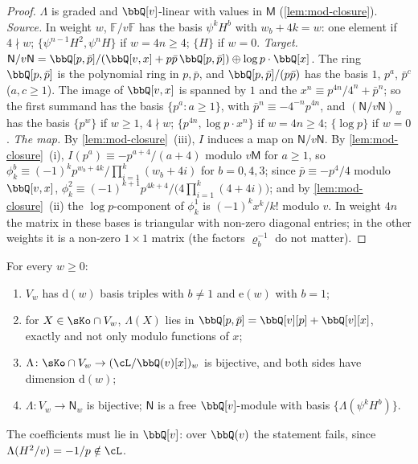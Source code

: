 \begin{proof}
$\Lambda$ is graded and $\bbQ[v]$-linear with values in $\mathsf M$ (\cref{lem:mod-closure}). \emph{Source.} In weight $w$, $\mathbb F/v\mathbb F$ has the basis $\psi^kH^b$ with $w_b+4k=w$: one element if $4\nmid w$; $\{\psi^{n-1}H^2,\psi^nH\}$ if $w=4n\geq 4$; $\{H\}$ if $w=0$. \emph{Target.} $\mathsf N/v\mathsf N=\bbQ[p,\bar p]/(\bbQ[v,x]+p\bar p\,\bbQ[p,\bar p])\oplus\log p\cdot\bbQ[x]$. The ring $\bbQ[p,\bar p]$ is the polynomial ring in $p,\bar p$, and $\bbQ[p,\bar p]/(p\bar p)$ has the basis $1$, $p^a$, $\bar p^c$ ($a,c\geq 1$). The image of $\bbQ[v,x]$ is spanned by $1$ and the $x^n\equiv p^{4n}/4^n+\bar p^n$; so the first summand has the basis $\{p^a:a\geq 1\}$, with $\bar p^n\equiv -4^{-n}p^{4n}$, and $(\mathsf N/v\mathsf N)_w$ has the basis $\{p^w\}$ if $w\geq 1$, $4\nmid w$; $\{p^{4n},\log p\cdot x^n\}$ if $w=4n\geq 4$; $\{\log p\}$ if $w=0$. \emph{The map.} By \cref{lem:mod-closure}~(iii), $I$ induces a map on $\mathsf N/v\mathsf N$. By \cref{lem:mod-closure}~(i), $I(p^a)\equiv -p^{a+4}/(a+4)$ modulo $v\mathsf M$ for $a\geq 1$, so $\phi^b_k\equiv(-1)^kp^{w_b+4k}/\prod_{i=1}^k(w_b+4i)$ for $b=0,4,3$; since $\bar p\equiv -p^4/4$ modulo $\bbQ[v,x]$, $\phi^2_k\equiv(-1)^{k+1}p^{4k+4}/\big(4\prod_{i=1}^k(4+4i)\big)$; and by \cref{lem:mod-closure}~(ii) the $\log p$-component of $\phi^1_k$ is $(-1)^kx^k/k!$ modulo $v$. In weight $4n$ the matrix in these bases is triangular with non-zero diagonal entries; in the other weights it is a non-zero $1\times 1$ matrix (the factors $\varrho_b^{-1}$ do not matter).
\end{proof}

\begin{thm}
\label{thm:mod-lattice}
For every $w\geq 0$:
\begin{enumerate}
\item[(a)] $V_w$ has $\mathrm d(w)$ basis triples with $b\neq 1$ and $\mathrm e(w)$ with $b=1$;
\item[(b)] for $X\in\sKo\cap V_w$, $\Lambda(X)$ lies in $\bbQ[p,\bar p]=\bbQ[v][p]+\bbQ[v][x]$, exactly and not only modulo functions of $x$;
\item[(c)] $\Lambda\colon\sKo\cap V_w\to(\cL/\bbQ(v)[x])_w$ is bijective, and both sides have dimension $\mathrm d(w)$;
\item[(d)] $\Lambda\colon V_w\to\mathsf N_w$ is bijective; $\mathsf N$ is a free $\bbQ[v]$-module with basis $\{\Lambda(\psi^kH^b)\}$.
\end{enumerate}
The coefficients must lie in $\bbQ[v]$: over $\bbQ(v)$ the statement fails, since $\Lambda(H^2/v)=-1/p\notin\cL$.
\end{thm}

